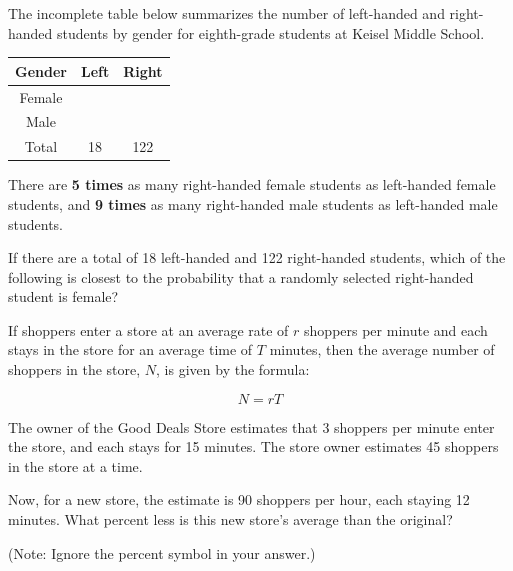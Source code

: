 \noindent\markforreview
\vspace{1em}

The incomplete table below summarizes the number of left-handed and right-handed students by gender for eighth-grade students at Keisel Middle School.

\begin{center}
\begin{tabular}{|c|c|c|}
\hline
\textbf{Gender} & \textbf{Left} & \textbf{Right} \\
\hline
Female &  &  \\
\hline
Male &  &  \\
\hline
Total & 18 & 122 \\
\hline
\end{tabular}
\end{center}

There are \textbf{5 times} as many right-handed female students as left-handed female students, and \textbf{9 times} as many right-handed male students as left-handed male students.

If there are a total of 18 left-handed and 122 right-handed students, which of the following is closest to the probability that a randomly selected right-handed student is female?

\vspace{0.75em}


\vspace{2em}
\newpage

\noindent\markforreview
\vspace{1em}

If shoppers enter a store at an average rate of \(r\) shoppers per minute and each stays in the store for an average time of \(T\) minutes, then the average number of shoppers in the store, \(N\), is given by the formula:

\[
N = rT
\]

The owner of the Good Deals Store estimates that 3 shoppers per minute enter the store, and each stays for 15 minutes. The store owner estimates 45 shoppers in the store at a time.

Now, for a new store, the estimate is 90 shoppers per hour, each staying 12 minutes. What percent less is this new store's average than the original?

(Note: Ignore the percent symbol in your answer.)

\vspace{0.75em}

